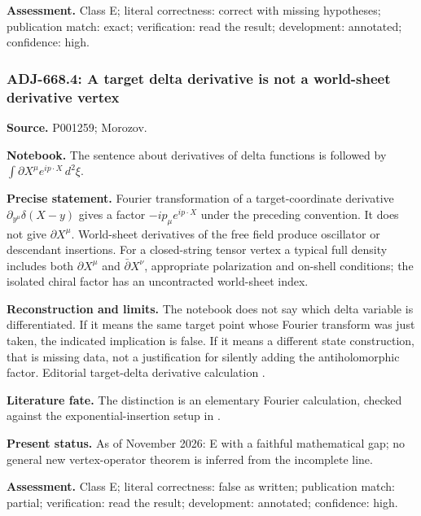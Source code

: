 \noindent\textbf{Assessment.} Class E; literal correctness: correct with missing hypotheses; publication match: exact; verification: read the result; development: annotated; confidence: high.\par

\subsubsection{ADJ-668.4: A target delta derivative is not a world-sheet derivative vertex}
\noindent\textbf{Source.} P001259; Morozov.\par
\noindent\textbf{Notebook.} The sentence about derivatives of delta functions is followed by \(\int\partial X^\mu e^{ip\cdot X}\,d^2\xi\).\par

\noindent\textbf{Precise statement.} Fourier transformation of a target-coordinate derivative \(\partial_{y^\mu}\delta(X-y)\) gives a factor \(-ip_\mu e^{ip\cdot X}\) under the preceding convention. It does not give \(\partial X^\mu\). World-sheet derivatives of the free field produce oscillator or descendant insertions. For a closed-string tensor vertex a typical full density includes both \(\partial X^\mu\) and \(\bar\partial X^\nu\), appropriate polarization and on-shell conditions; the isolated chiral factor has an uncontracted world-sheet index.\par

\noindent\textbf{Reconstruction and limits.} The notebook does not say which delta variable is differentiated. If it means the same target point whose Fourier transform was just taken, the indicated implication is false. If it means a different state construction, that is missing data, not a justification for silently adding the antiholomorphic factor. Editorial target-delta derivative calculation \oursComputed.\par

\noindent\textbf{Literature fate.} The distinction is an elementary Fourier calculation, checked against the exponential-insertion setup in \citet[eqs.~(26)--(31)]{polyakov1981quantum}.\par

\noindent\textbf{Present status.} As of November 2026: E with a faithful mathematical gap; no general new vertex-operator theorem is inferred from the incomplete line.\par

\noindent\textbf{Assessment.} Class E; literal correctness: false as written; publication match: partial; verification: read the result; development: annotated; confidence: high.\par

